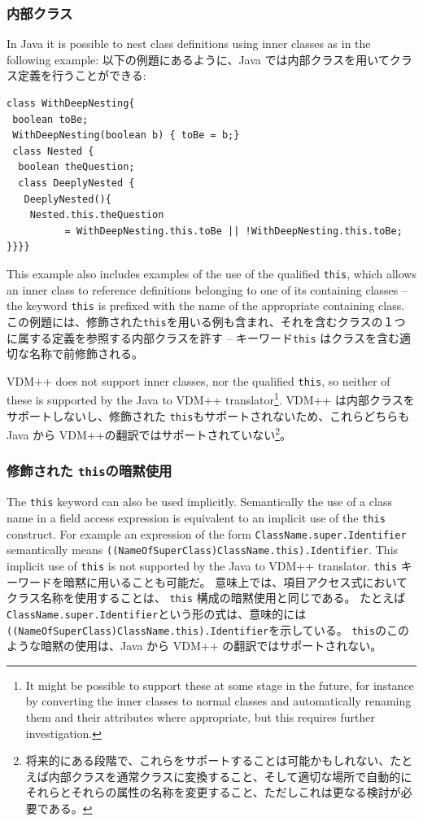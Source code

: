 \documentclass[\pformat,12pt]{jarticle}
\begin{document}
\subsubsection{内部クラス}

In Java it is possible to nest class definitions using inner classes
as in the following example: 
以下の例題にあるように、Java では内部クラスを用いてクラス定義を行うことができる:
\begin{small}
\begin{verbatim}
class WithDeepNesting{
 boolean toBe;
 WithDeepNesting(boolean b) { toBe = b;}
 class Nested {
  boolean theQuestion;
  class DeeplyNested {
   DeeplyNested(){
    Nested.this.theQuestion
          = WithDeepNesting.this.toBe || !WithDeepNesting.this.toBe; }}}}
\end{verbatim}
\end{small}

This example also includes examples of the use of the qualified
\texttt{this}, which allows an inner class to reference definitions
belonging to one of its containing classes -- the keyword
\texttt{this} is prefixed with the name of the appropriate containing
class. 
この例題には、修飾された\texttt{this}を用いる例も含まれ、それを含むクラスの１つに属する定義を参照する内部クラスを許す -- キーワード\texttt{this} はクラスを含む適切な名称で前修飾される。

VDM++ does not support inner classes, nor the qualified \texttt{this},
so neither of these is supported by the Java to VDM++
translator\footnote{It might be possible to support these
  at some stage in the future, for instance by converting the inner
  classes to normal classes and automatically renaming them and
  their attributes where appropriate, but this requires further
  investigation.}.
VDM++ は内部クラスをサポートしないし、修飾された \texttt{this}もサポートされないため、これらどちらも Java から VDM++の翻訳ではサポートされていない\footnote{将来的にある段階で、これらをサポートすることは可能かもしれない、たとえば内部クラスを通常クラスに変換すること、そして適切な場所で自動的にそれらとそれらの属性の名称を変更すること、ただしこれは更なる検討が必要である。}。


\subsubsection{修飾された \texttt{this}の暗黙使用}

The \texttt{this} keyword can also be used implicitly. Semantically
the use of a class name in a field access expression is equivalent to
an implicit use of the \texttt{this} construct. For example an
expression of the form \texttt{ClassName.super.Identifier}
semantically means \texttt{((NameOfSuperClass)ClassName.this).Identifier}. This
implicit use of \texttt{this} is not supported by the
Java to VDM++ translator.
\texttt{this} キーワードを暗黙に用いることも可能だ。
意味上では、項目アクセス式においてクラス名称を使用することは、 \texttt{this} 構成の暗黙使用と同じである。
たとえば \texttt{ClassName.super.Identifier}という形の式は、意味的には \texttt{((NameOfSuperClass)ClassName.this).Identifier}を示している。
 \texttt{this}のこのような暗黙の使用は、Java から VDM++ の翻訳ではサポートされない。
\end{document}
